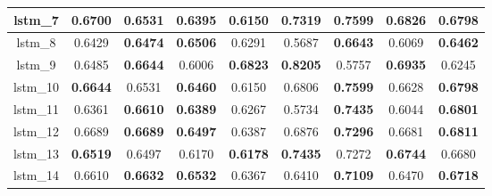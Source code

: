 \begin{table}[hp]
\begin{tabular} {|c|c|c|c|c|c|c|c|c| }
        lstm\_7  & \textbf{0.6700}                     & 0.6531                              & \textbf{0.6395}                     & 0.6150                              & 0.7319                              & \textbf{0.7599}                     & \textbf{0.6826}                     & 0.6798                              \\ \hline
        lstm\_8  & 0.6429                              & \textbf{0.6474}                     & \textbf{0.6506}                     & 0.6291                              & 0.5687                              & \textbf{0.6643}                     & 0.6069                              & \textbf{0.6462}                     \\ \hline
        lstm\_9  & 0.6485                              & \textbf{0.6644}                     & 0.6006                              & \textbf{\cellcolor{green!50}0.6823} & \textbf{\cellcolor{green!50}0.8205} & 0.5757                              & \textbf{0.6935}                     & 0.6245                              \\ \hline
        lstm\_10 & \textbf{0.6644}                     & 0.6531                              & \textbf{0.6460}                     & 0.6150                              & 0.6806                              & \textbf{0.7599}                     & 0.6628                              & \textbf{0.6798}                     \\ \hline
        lstm\_11 & 0.6361                              & \textbf{0.6610}                     & \textbf{0.6389}                     & 0.6267                              & 0.5734                              & \textbf{0.7435}                     & 0.6044                              & \textbf{0.6801}                     \\ \hline
        lstm\_12 & 0.6689                              & \textbf{\cellcolor{green!50}0.6689} & \textbf{0.6497}                     & 0.6387                              & 0.6876                              & \textbf{0.7296}                     & 0.6681                              & \textbf{0.6811}                     \\ \hline
        lstm\_13 & \textbf{0.6519}                     & 0.6497                              & 0.6170                              & \textbf{0.6178}                     & \textbf{0.7435}                     & 0.7272                              & \textbf{0.6744}                     & 0.6680                              \\ \hline
        lstm\_14 & 0.6610                              & \textbf{0.6632}                     & \textbf{\cellcolor{green!50}0.6532} & 0.6367                              & 0.6410                              & \textbf{0.7109}                     & 0.6470                              & \textbf{0.6718}                     \\ \hline

\end{tabular}
\end{table}
